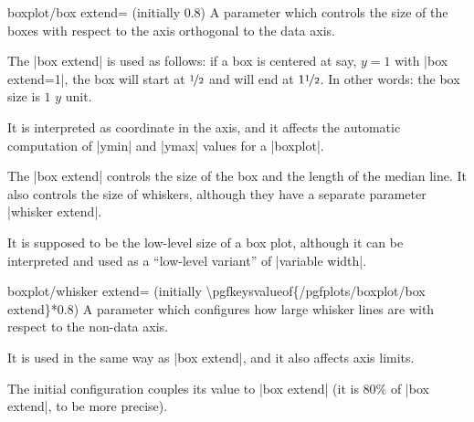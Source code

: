 \begin{pgfplotskey}{boxplot/box extend= (initially 0.8)}
    A parameter which controls the size of the boxes with respect to the axis
    orthogonal to the data axis.

    The |box extend| is used as follows: if a box is centered at say, $y=1$
    with |box extend=1|, the box will start at $\nicefrac{1}{2}$ and will end at $1
    \nicefrac{1}{2}$. In other words: the box size is $1$ $y$ unit.

    It is interpreted as coordinate in the axis, and it affects the automatic
    computation of |ymin| and |ymax| values for a |boxplot|.
\begin{codeexample}[]
\end{codeexample}

    The |box extend| controls the size of the box and the length of the median
    line. It also controls the size of whiskers, although they have a separate
    parameter |whisker extend|.

    It is supposed to be the low-level size of a box plot, although it can be
    interpreted and used as a ``low-level variant'' of |variable width|.
\end{pgfplotskey}

\begin{pgfplotskey}{boxplot/whisker extend= (initially \textbackslash pgfkeysvalueof\{/pgfplots/boxplot/box extend\}*0.8)}
    A parameter which configures how large whisker lines are with respect to
    the non-data axis.

    It is used in the same way as |box extend|, and it also affects axis
    limits.

    The initial configuration couples its value to |box extend| (it is $80\%$
    of |box extend|, to be more precise).
\end{pgfplotskey}


